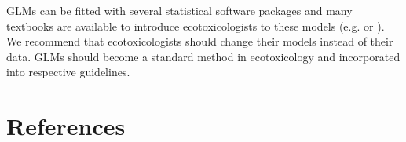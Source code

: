 GLMs can be fitted with several statistical software packages and many textbooks are available to introduce ecotoxicologists to these models (e.g. \citealt{zuur_beginners_2013} or \citealt{quinn_experimental_2009}).
We recommend that ecotoxicologists should change their models instead of their data.
GLMs should become a standard method in ecotoxicology and incorporated into respective guidelines.

\clearpage
\section{References}
\printbibliography[heading=none]
